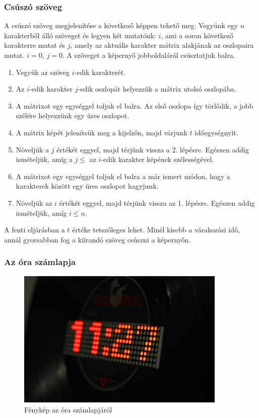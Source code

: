 \documentclass[a4paper, 12pt]{article}
\begin{document}
\subsubsection{Csúszó szöveg}
A csúszó szöveg megjelenítése a következő képpen tehető meg:
Vegyünk egy $n$ karakterből álló szöveget és legyen két mutatónk: $i$, ami a soron következő karakterre mutat és $j$, amely az aktuális karakter mátrix alakjának az oszlopaira mutat. $i = 0$, $j = 0$.
A szöveget a képernyő jobboldaláról csúsztatjuk balra.
\begin{enumerate}
	\item Vegyük az szöveg $i$-edik karakterét.
	\item Az $i$-edik karakter $j$-edik oszlopát helyezzük a mátrix utolsó oszlopába.
	\item A mátrixot egy egységgel toljuk el balra. Az első oszlopa így törlődik, a jobb szélére helyezzünk egy üres oszlopot.
	\item A mátrix képét jelenítsük meg a kijelzőn, majd várjunk $t$ időegységnyit.
	\item Növeljük a $j$ értékét eggyel, majd térjünk vissza a 2. lépésre. Egészen addig ismételjük, amíg a $j \leq$ az $i$-edik karakter képének szélességével.
	\item A mátrixot egy egységgel toljuk el balra a már ismert módon, hogy a karakterek között egy üres oszlopot hagyjunk.
	\item Növeljük az $i$ értékét eggyel, majd térjünk vissza az 1. lépésre. Egészen addig ismételjük, amíg $i \leq n$.
\end{enumerate}

A fenti eljárásban a $t$ értéke tetszőleges lehet. Minél kisebb a várakozási idő, annál gyorsabban fog a kiírandó szöveg csúszni a képernyőn.

\subsubsection{Az óra számlapja}

\begin{figure}[ht]
	\centering
	\includegraphics[width = 10cm]{images/clockface.JPG}
	\caption{Fénykép az óra számlapjáról}
	\label{fig:clockface}
\end{figure}	
\end{document}

